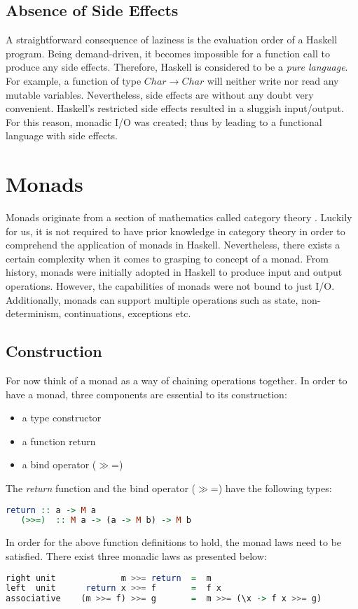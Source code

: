 \documentclass[a4paper, onecolumn]{article}
\begin{document}
\subsection{Absence of Side Effects}

A straightforward consequence of laziness is the evaluation order of a Haskell program. Being demand-driven, it becomes impossible for a function call to produce any side effects. Therefore, Haskell is considered to be a \textit{pure language}. For example, a function of type $Char \rightarrow Char$ will neither write nor read any mutable variables. Nevertheless, side effects are without any doubt very convenient. Haskell's restricted side effects resulted in a sluggish input/output. For this reason, monadic I/O was created; thus by leading to a functional language with side effects. 
\section{Monads}
Monads originate from a section of mathematics called category theory \cite{categorytheory}. Luckily for us, it is not required to have prior knowledge in category theory in order to comprehend the application of monads in Haskell. 
Nevertheless, there exists a certain complexity when it comes to grasping to concept of a monad. From history, monads were initially adopted in Haskell to produce input and output operations. However, the capabilities of monads were not bound to just I/O. Additionally, monads can support multiple operations such as state, non-determinism, continuations, exceptions etc.
\subsection{Construction}
For now think of a monad as a way of chaining operations together. 
In order to have a monad, three components are essential to its construction: 
\begin{itemize}
    \item a type constructor
    \item a function return
    \item a bind operator ($\gg$=)
\end{itemize}
The \textit{return} function and the bind operator ($\gg$=) have the following types: 
\begin{tcolorbox}
  \begin{lstlisting}[language=Haskell]
   return :: a -> M a 
   (>>=)  :: M a -> (a -> M b) -> M b 
  \end{lstlisting}
\end{tcolorbox}
In order for the above function definitions to hold, the monad laws need to be satisfied. There exist three monadic laws as presented below: 
\begin{tcolorbox}
  \begin{lstlisting}[language=Haskell]
right unit             m >>= return  =  m 
left  unit      return x >>= f       =  f x   
associative    (m >>= f) >>= g       =  m >>= (\x -> f x >>= g) 
  \end{lstlisting}
\end{tcolorbox}
\end{document}
